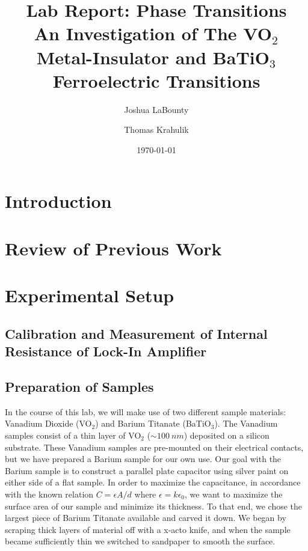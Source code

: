\documentclass[%
 reprint,
 amsmath,amssymb,
 aps,
 pra,
]{revtex4-1}
\begin{document}

\title{\textbf{Lab Report: Phase Transitions} \\ \small{An Investigation of The VO$_2$ Metal-Insulator and BaTiO$_3$ Ferroelectric Transitions}}
\author{Joshua LaBounty}
\author{Thomas Krahulik}

\date{\today}

\begin{abstract}
	\lipsum[1]
\end{abstract}
\maketitle

\section{Introduction}



\section{Review of Previous Work}

\section{Experimental Setup}

\subsection{Calibration and Measurement of Internal Resistance of Lock-In Amplifier}

\subsection{Preparation of Samples}

In the course of this lab, we will make use of two different sample materials: Vanadium Dioxide (VO$_2$) and Barium Titanate (BaTiO$_3$). The Vanadium samples consist of a thin layer of VO$_2$ ($\sim 100~nm$) deposited on a silicon substrate. These Vanadium samples are pre-mounted on their electrical contacts, but we have prepared a Barium sample for our own use. Our goal with the Barium sample is to construct a parallel plate capacitor using silver paint on either side of a flat sample. In order to maximize the capacitance, in accordance with the known relation $C = \epsilon A/d$ where $\epsilon = k \epsilon_0$, we want to maximize the surface area of our sample and minimize its thickness. To that end, we chose the largest piece of Barium Titanate available and carved it down. We began by scraping thick layers of material off with a x-acto knife, and when the sample became sufficiently thin we switched to sandpaper to smooth the surface.
\end{document}
